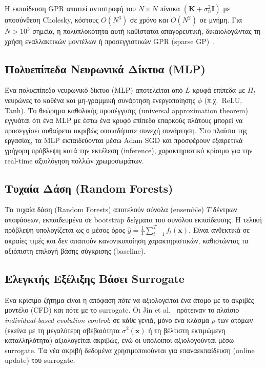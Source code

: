 Η εκπαίδευση GPR απαιτεί αντιστροφή του $N \times N$ πίνακα $(\bm{K} + \sigma_n^2 \bm{I})$ με αποσύνθεση Cholesky, κόστους $O(N^3)$ σε χρόνο και $O(N^2)$ σε μνήμη. Για $N > 10^3$ σημεία, η πολυπλοκότητα αυτή καθίσταται απαγορευτική, δικαιολογώντας τη χρήση εναλλακτικών μοντέλων ή προσεγγιστικών GPR (sparse GP)~\cite{gramacy2020surrogates}.

\subsection*{Πολυεπίπεδα Νευρωνικά Δίκτυα (MLP)}

Ένα πολυεπίπεδο νευρωνικό δίκτυο (MLP) αποτελείται από $L$ κρυφά επίπεδα με $H_l$ νευρώνες το καθένα και μη-γραμμική συνάρτηση ενεργοποίησης $\phi$ (π.χ.\ ReLU, Tanh). Το θεώρημα καθολικής προσέγγισης (universal approximation theorem) εγγυάται ότι ένα MLP με έστω ένα κρυφό επίπεδο επαρκούς πλάτους μπορεί να προσεγγίσει αυθαίρετα ακριβώς οποιαδήποτε συνεχή συνάρτηση. Στο πλαίσιο της εργασίας, τα MLP εκπαιδεύονται μέσω Adam SGD και προσφέρουν εξαιρετικά γρήγορη πρόβλεψη κατά την εκτέλεση (inference), χαρακτηριστικό κρίσιμο για την real-time αξιολόγηση πολλών χρωμοσωμάτων.

\subsection*{Τυχαία Δάση (Random Forests)}

Τα τυχαία δάση (Random Forests) αποτελούν σύνολα (ensemble) $T$ δέντρων αποφάσεων, εκπαιδευμένα σε bootstrap δείγματα του συνόλου εκπαίδευσης. Η τελική πρόβλεψη υπολογίζεται ως ο μέσος όρος $\hat{y} = \frac{1}{T}\sum_{t=1}^T f_t(\bm{x})$. Είναι ανθεκτικά σε ακραίες τιμές και δεν απαιτούν κανονικοποίηση χαρακτηριστικών, καθιστώντας τα αξιόπιστη επιλογή βάσης σύγκρισης (baseline).

\subsection*{Ελεγκτής Εξέλιξης Βάσει Surrogate}

Ένα κρίσιμο ζήτημα είναι η απόφαση \textit{πότε} να αξιολογείται ένα άτομο με το ακριβές μοντέλο (CFD) και πότε με το surrogate. Οι Jin et al.~\cite{jin2002framework} πρότειναν το πλαίσιο \textit{individual-based evolution control}: σε κάθε γενιά, μόνο ένα κλάσμα $\rho$ των ατόμων (εκείνα με τη μεγαλύτερη αβεβαιότητα $\sigma^2(\bm{x})$ ή τη βέλτιστη εκτιμώμενη καταλληλότητα) αξιολογείται ακριβώς, ενώ οι υπόλοιποι αξιολογούνται μέσω surrogate. Τα νέα ακριβή δεδομένα χρησιμοποιούνται για επαναεκπαίδευση (online update) του surrogate.

